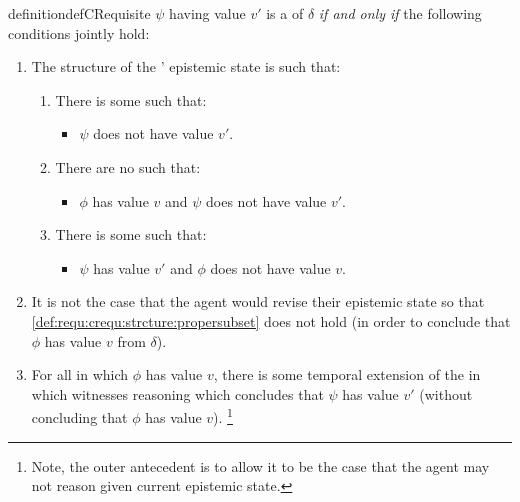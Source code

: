 \begin{note}
\begin{restatable}[A \crequ{0}]{definition}{defCRequisite}
    \(\psi\) having value \(v'\) is a \emph{\crequ{}} of \(\delta\) \emph{if and only if} the following conditions jointly hold:
    \begin{enumerate}[label=\arabic*., ref=\named{C\(\Re\):\arabic*}]
    \item
      \label{def:requ:crequ:strcture}
      The structure of the \vAgent{}' epistemic state is such that:
      \begin{enumerate}[label=\alph*., ref=\named{C\(\Re\):1\alph*}]
      \item
        \label{def:requ:crequ:strcture:psi-not-v}
        There is some \epVW{} such that:
        \begin{itemize}
        \item
          \(\psi\) does not have value \(v'\).
        \end{itemize}
      \item
        \label{def:requ:crequ:strcture:subset}
        There are no  such that:
        \begin{itemize}
        \item \(\phi\) has value \(v\) and \(\psi\) does not have value \(v'\).
        \end{itemize}
      \item
        \label{def:requ:crequ:strcture:propersubset}
        There is some \epVW{} such that:
        \begin{itemize}
        \item \(\psi\) has value \(v'\) and \(\phi\) does not have value \(v\).
        \end{itemize}
      \end{enumerate}
    \item
      \label{def:requ:crequ:no-revision}
      It is not the case that the agent would revise their epistemic state so that \ref{def:requ:crequ:strcture:propersubset} does not hold (in order to conclude that \(\phi\) has value \(v\) from \(\delta\)).
    \item
      \label{def:requ:crequ:possible-reason}
      For all \epVW{} in which \(\phi\) has value \(v\), there is some temporal extension of the \world{} in which \vAgent{} witnesses reasoning which concludes that \(\psi\) has value \(v'\) (without concluding that \(\phi\) has value \(v\)).\nolinebreak
      \footnote{
        Note, the outer antecedent is to allow it to be the case that the agent may not reason given current epistemic state.
      }
    \end{enumerate}
    \vspace{-\baselineskip}
  \end{restatable}
\end{note}

